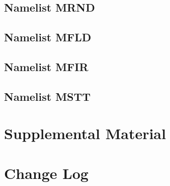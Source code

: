 \documentclass[12pt,twoside]{book}
\begin{document}
\section{Namelist MRND}

\section{Namelist MFLD}

\section{Namelist MFIR}

\section {Namelist MSTT}
\chapter{Supplemental Material}

\chapter{Change Log}

\label{last_page}
\end{document}
